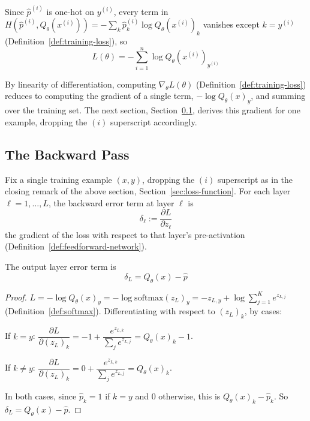 		\begin{remark}
			\label{rem:training-loss-closed-form}
			Since $\hat p^{(i)}$ is one-hot on $y^{(i)}$, every term in $H(\hat p^{(i)},Q_\theta(x^{(i)}))=-\sum_k\hat p^{(i)}_k\log Q_\theta(x^{(i)})_k$ vanishes except $k=y^{(i)}$ (Definition~\ref{def:training-loss}), so
			\[
				L(\theta) = -\sum_{i=1}^n \log Q_\theta(x^{(i)})_{y^{(i)}}
			\]
		\end{remark}
		
		\begin{remark}
			\label{rem:loss-single-example}
			By linearity of differentiation, computing $\nabla_\theta L(\theta)$ (Definition~\ref{def:training-loss}) reduces to computing the gradient of a single term, $-\log Q_\theta(x)_y$, and summing over the training set. The next section, Section~\ref{sec:backward-pass}, derives this gradient for one example, dropping the $(i)$ superscript accordingly.
		\end{remark}
		
	\subsection{The Backward Pass}
	\label{sec:backward-pass}
		
		\begin{definition}
			\label{def:backward-error}
			Fix a single training example $(x,y)$, dropping the $(i)$ superscript as in the closing remark of the above section, Section~\ref{sec:loss-function}. For each layer $\ell=1,\dots,L$, the backward error term at layer $\ell$ is
			\[
				\delta_\ell := \frac{\partial L}{\partial z_\ell}
			\]
			the gradient of the loss with respect to that layer's pre-activation (Definition~\ref{def:feedforward-network}).
		\end{definition}
		
		\begin{proposition}
			\label{prop:output-layer-error}
			The output layer error term is
			\[
				\delta_L = Q_\theta(x) - \hat p
			\]
		\end{proposition}
		
		\begin{proof}
			$L = -\log Q_\theta(x)_y = -\log\mathrm{softmax}(z_L)_y = -z_{L,y} + \log\sum_{j=1}^K e^{z_{L,j}}$ (Definition~\ref{def:softmax}). Differentiating with respect to $(z_L)_k$, by cases:
			
			If $k=y$: $\dfrac{\partial L}{\partial(z_L)_k} = -1 + \dfrac{e^{z_{L,k}}}{\sum_je^{z_{L,j}}} = Q_\theta(x)_k - 1$.
			
			If $k\neq y$: $\dfrac{\partial L}{\partial(z_L)_k} = 0 + \dfrac{e^{z_{L,k}}}{\sum_je^{z_{L,j}}} = Q_\theta(x)_k$.
			
			In both cases, since $\hat p_k=1$ if $k=y$ and $0$ otherwise, this is $Q_\theta(x)_k - \hat p_k$. So $\delta_L = Q_\theta(x)-\hat p$.
		\end{proof}
		

